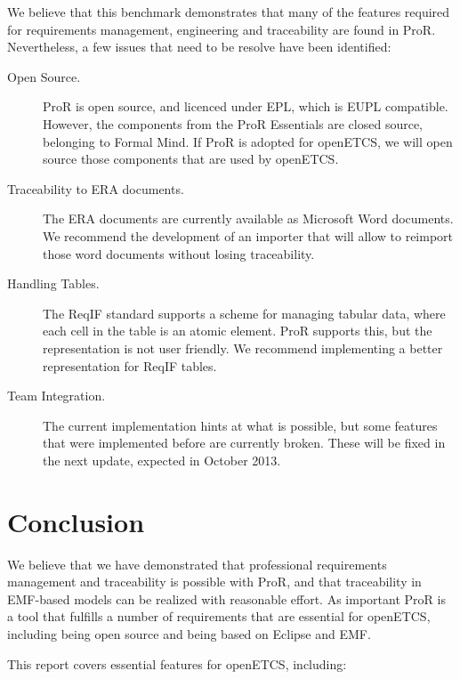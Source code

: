 \documentclass{template/openetcs_report}
\begin{document}
We believe that this benchmark demonstrates that many of the features required for requirements management, engineering and traceability are found in ProR.  Nevertheless, a few issues that need to be resolve have been identified:

\begin{description}

\item[Open Source.] ProR is open source, and licenced under EPL, which is EUPL compatible.  However, the components from the ProR Essentials are closed source, belonging to Formal Mind.  If ProR is adopted for openETCS, we will open source those components that are used by openETCS.

\item[Traceability to ERA documents.]  The ERA documents are currently available as Microsoft Word documents.  We recommend the development of an importer that will allow to reimport those word documents without losing traceability.

\item[Handling Tables.]  The ReqIF standard supports a scheme for managing tabular data, where each cell in the table is an atomic element.  ProR supports this, but the representation is not user friendly.  We recommend implementing a better representation for ReqIF tables.

\item[Team Integration.]  The current implementation hints at what is possible, but some features that were implemented before are currently broken.  These will be fixed in the next update, expected in October 2013.

\end{description}

\chapter{Conclusion}

We believe that we have demonstrated that professional requirements management and traceability is possible with ProR, and that traceability in EMF-based models can be realized with reasonable effort.  As important ProR is a tool that fulfills a number of requirements that are essential for openETCS, including being open source and being based on Eclipse and EMF.

This report covers essential features for openETCS, including:
\end{document}
